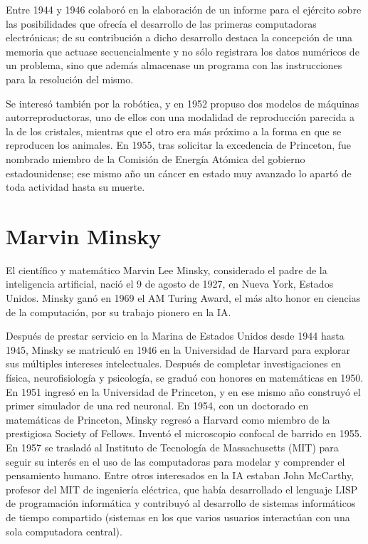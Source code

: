 \documentclass[letterpaper, 11pt]{article}
\begin{document}
\noindent Entre 1944 y 1946 colaboró en la elaboración de un informe para el ejército sobre las posibilidades que ofrecía el desarrollo de las primeras computadoras electrónicas; de su contribución a dicho desarrollo destaca la concepción de una memoria que actuase secuencialmente y no sólo registrara los datos numéricos de un problema, sino que además almacenase un programa con las instrucciones para la resolución del mismo.

\noindent Se interesó también por la robótica, y en 1952 propuso dos modelos de máquinas autorreproductoras, uno de ellos con una modalidad de reproducción parecida a la de los cristales, mientras que el otro era más próximo a la forma en que se reproducen los animales. En 1955, tras solicitar la excedencia de Princeton, fue nombrado miembro de la Comisión de Energía Atómica del gobierno estadounidense; ese mismo año un cáncer en estado muy avanzado lo apartó de toda actividad hasta su muerte.
\newpage
\section*{Marvin Minsky}


El científico y matemático Marvin Lee Minsky, considerado el padre de la inteligencia artificial, nació el 9 de agosto de 1927,  en Nueva York, Estados Unidos. Minsky ganó en 1969 el AM Turing Award, el más alto honor en ciencias de la computación, por su trabajo pionero en la IA.

\noindent Después de prestar servicio en la Marina de Estados Unidos desde 1944 hasta 1945, Minsky se matriculó en 1946 en la Universidad de Harvard para explorar sus múltiples intereses intelectuales. Después de completar investigaciones en física, neurofisiología y psicología, se graduó con honores en matemáticas en 1950. En 1951 ingresó en la Universidad de Princeton, y en ese mismo año construyó el primer simulador de una red neuronal. 
\noindent En 1954, con un doctorado en matemáticas de Princeton, Minsky regresó a Harvard como miembro de la prestigiosa Society of Fellows. Inventó el microscopio confocal de barrido en 1955.
\noindent En 1957 se trasladó al Instituto de Tecnología de Massachusetts (MIT) para seguir su interés en el uso de las computadoras para modelar y comprender el pensamiento humano. Entre otros interesados en la IA estaban John McCarthy, profesor del MIT de ingeniería eléctrica, que había desarrollado el lenguaje LISP de programación informática y contribuyó al desarrollo de sistemas informáticos de tiempo compartido  (sistemas en los que varios usuarios interactúan con una sola computadora central). 
\end{document}
